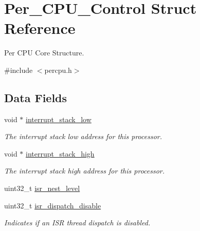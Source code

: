 \hypertarget{structPer__CPU__Control}{}\section{Per\+\_\+\+C\+P\+U\+\_\+\+Control Struct Reference}
\label{structPer__CPU__Control}


Per C\+PU Core Structure.  




{\ttfamily \#include $<$percpu.\+h$>$}

\subsection*{Data Fields}
\begin{DoxyCompactItemize}
\item 
\mbox{\label{structPer__CPU__Control_af4f231b359e49935320c7bb75570fc4e}} 
void $\ast$ \mbox{\hyperlink{structPer__CPU__Control_af4f231b359e49935320c7bb75570fc4e}{interrupt\+\_\+stack\+\_\+low}}
\begin{DoxyCompactList}\small\item\em The interrupt stack low address for this processor. \end{DoxyCompactList}\item 
\mbox{\label{structPer__CPU__Control_a358b6ecaa2a521b92b5999e2df486276}} 
void $\ast$ \mbox{\hyperlink{structPer__CPU__Control_a358b6ecaa2a521b92b5999e2df486276}{interrupt\+\_\+stack\+\_\+high}}
\begin{DoxyCompactList}\small\item\em The interrupt stack high address for this processor. \end{DoxyCompactList}\item 
uint32\+\_\+t \mbox{\hyperlink{structPer__CPU__Control_aee16a4dbad577bfb87c857042f089c69}{isr\+\_\+nest\+\_\+level}}
\item 
uint32\+\_\+t \mbox{\hyperlink{structPer__CPU__Control_a255ba7c5e213a7a2513ab0c5a5a29f64}{isr\+\_\+dispatch\+\_\+disable}}
\begin{DoxyCompactList}\small\item\em Indicates if an I\+SR thread dispatch is disabled. \end{DoxyCompactList}\item 
\mbox{\label{structPer__CPU__Control_a76fecf04eaa2fa1a3acade2171fe2e75}} 

\end{DoxyCompactItemize}
